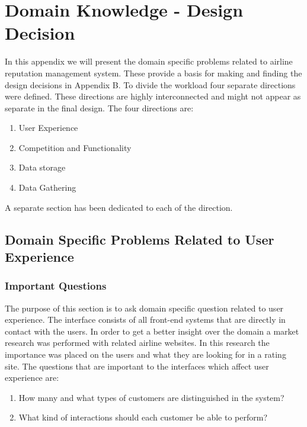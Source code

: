 \section{Domain Knowledge - Design Decision}
\label{sec:domain}
In this appendix we will present the domain specific problems related to airline reputation management system. These provide a basis for making and finding the design decisions in Appendix B. 
To divide the workload four separate directions were defined. These directions are highly interconnected and might not appear as separate in the final design. The four directions are:
\begin{enumerate}
\item User Experience
\item Competition and Functionality
\item Data storage
\item Data Gathering
\end{enumerate}
A separate section has been dedicated to each of the direction. 

\subsection{Domain Specific Problems Related to User Experience}
\subsubsection{Important Questions}
The purpose of this section is to ask domain specific question related to user experience. The interface consists of all front-end systems that are directly in contact with the users. 
In order to get a better insight over the domain a market research was performed with related airline websites. In this research the importance was placed on the users and what they are looking for in a rating site. 
The questions that are important to the interfaces which affect user experience are:
\begin{enumerate}
\item How many and what types of customers are distinguished in the system?
\item What kind of interactions should each customer be able to perform?
\end{enumerate}

